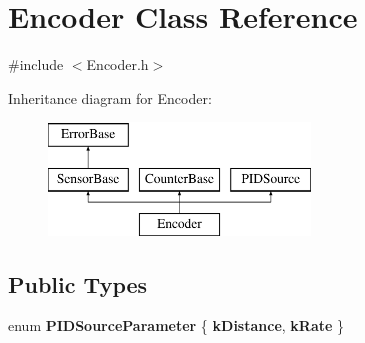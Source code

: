 \hypertarget{classEncoder}{\section{\-Encoder \-Class \-Reference}
\label{classEncoder}
}


{\ttfamily \#include $<$\-Encoder.\-h$>$}

\-Inheritance diagram for \-Encoder\-:\begin{figure}[H]
\begin{center}
\leavevmode
\includegraphics[height=3.000000cm]{classEncoder}
\end{center}
\end{figure}
\subsection*{\-Public \-Types}
\begin{DoxyCompactItemize}
\item 
enum {\bfseries \-P\-I\-D\-Source\-Parameter} \{ {\bfseries k\-Distance}, 
{\bfseries k\-Rate}
 \}
\end{DoxyCompactItemize}
